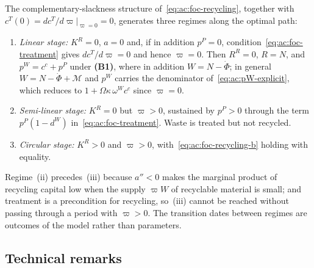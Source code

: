  The complementary-slackness structure of~\eqref{eq:ac:foc-recycling}, together with $c^T(0)=dc^T/d\varpi|_{\varpi=0}=0$, generates three regimes along the optimal path:
\begin{enumerate}[label=(\roman*),leftmargin=2.4em]
\item \emph{Linear stage:} $K^R=0$, $a=0$ and, if in addition $p^P=0$, condition~\eqref{eq:ac:foc-treatment} gives $dc^T/d\varpi=0$ and hence $\varpi=0$. Then $R^R=0$, $R=N$, and $p^W=c^c+p^P$ under \textbf{(B1)}, where in addition $W=N-\dot\Phi$; in general $W=N-\dot\Phi+\mathcal M$ and $p^W$ carries the denominator of~\eqref{eq:ac:pW-explicit}, which reduces to $1+\Omega\kappa\,\omega^Wc^c$ since $\varpi=0$.
\item \emph{Semi-linear stage:} $K^R=0$ but $\varpi>0$, sustained by $p^P>0$ through the term $p^P(1-d^W)$ in~\eqref{eq:ac:foc-treatment}. Waste is treated but not recycled.
\item \emph{Circular stage:} $K^R>0$ and $\varpi>0$, with~\eqref{eq:ac:foc-recycling-b} holding with equality.
\end{enumerate}
Regime~(ii) precedes~(iii) because $a''<0$ makes the marginal product of recycling capital low when the supply $\varpi W$ of recyclable material is small; and treatment is a precondition for recycling, so~(iii) cannot be reached without passing through a period with $\varpi>0$. The transition dates between regimes are outcomes of the model rather than parameters.

\subsection{Technical remarks}
\label{subsec:ac:remarks}

